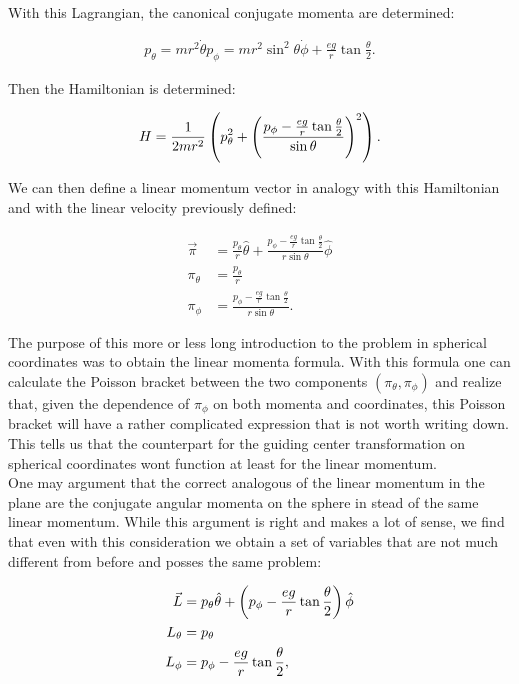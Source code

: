 With this Lagrangian, the canonical conjugate momenta are determined:

\begin{align*}
p_\theta = mr^2\dot{\theta}
p_\phi = mr^2\sin^2\theta\dot{\phi} + \frac{eg}{r}\tan{\frac{\theta}{2}}.
\end{align*}

Then the Hamiltonian is determined:

\begin{equation}
H = \frac{1}{2mr^2}\left( p_\theta^2 + \left( \frac{p_\phi - \frac{eg}{r}\tan{\frac{\theta}{2}}}{\sin\theta} \right)^2 \right).
\end{equation}

We can then define a linear momentum vector in analogy with this Hamiltonian and with the linear velocity previously defined:

\begin{align*}
\vec{\pi} &= \frac{p_\theta}{r}\hat{\theta} + \frac{p_\phi - \frac{eg}{r}\tan{\frac{\theta}{2}}}{r\sin\theta}\hat{\phi}\\
\pi_\theta &= \frac{p_\theta}{r}\\
\pi_\phi &= \frac{p_\phi - \frac{eg}{r}\tan{\frac{\theta}{2}}}{r\sin\theta}.
\end{align*}

The purpose of this more or less long introduction to the problem in spherical coordinates was to obtain the linear momenta formula. With this formula one can calculate the Poisson bracket between the two components $(\pi_\theta,\pi_\phi)$ and realize that, given the dependence of $\pi_\phi$ on both momenta and coordinates, this Poisson bracket will have a rather complicated expression that is not worth writing down. This tells us that the counterpart for the guiding center transformation on spherical coordinates wont function at least for the linear momentum. \\

One may argument that the correct analogous of the linear momentum in the plane are the conjugate angular momenta on the sphere in stead of the same linear momentum. While this argument is right and makes a lot of sense, we find that even with this consideration we obtain a set of variables that are not much different from before and posses the same problem:

\begin{align*}
\vec{L} &= p_\theta\hat{\theta} + \left( p_\phi - \frac{eg}{r}\tan{\frac{\theta}{2}} \right)\hat{\phi}\\
L_\theta &= p_\theta\\
L_\phi &= p_\phi - \frac{eg}{r}\tan{\frac{\theta}{2}},
\end{align*}

